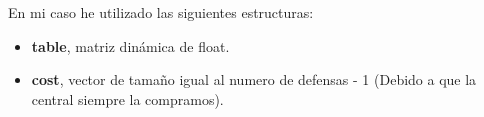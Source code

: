 En mi caso he utilizado las siguientes estructuras:
\begin{itemize}
    \item \textbf{table}, matriz dinámica de float.
    \item \textbf{cost}, vector de tamaño igual al numero de defensas - 1 (Debido a que la central siempre la compramos).
\end{itemize}